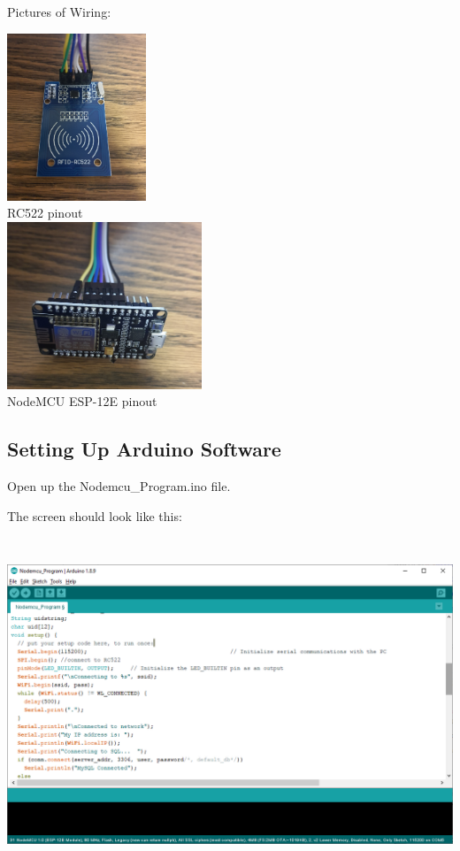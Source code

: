 \documentclass[12pt]{article}
\begin{document}
\begin{spacing}{1.2}
Pictures of Wiring:
\begin{center}
\includegraphics[height=5cm]{RC522 Pinout.jpg}\\
RC522 pinout \\
\includegraphics[height=5cm]{NodeMCU Pinout.jpg} \\
NodeMCU ESP-12E pinout \\
\end{center}

\subsection{Setting Up Arduino Software}\label{programming box}

Open up the Nodemcu\_Program.ino file.

The screen should look like this:

\begin{center}
\includegraphics[height=10cm]{Arduino Program.PNG}
\end{center}


\end{spacing}
\end{document}
